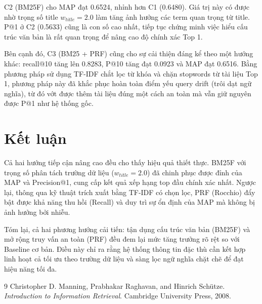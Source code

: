 \documentclass[12pt, a4paper]{article}
\begin{document}
C2 (BM25F) cho MAP đạt 0.6524, nhỉnh hơn C1 (0.6480). Giá trị này có được nhờ trọng số title $w_{title}=2.0$ làm tăng ảnh hưởng các term quan trọng từ title. P@1 ở C2 (0.5633) cũng là con số cao nhất, tiếp tục chứng minh việc hiểu cấu trúc văn bản là rất quan trọng để nâng cao độ chính xác Top 1.

Bên cạnh đó, C3 (BM25 + PRF) cũng cho sự cải thiện đáng kể theo một hướng khác: recall@10 tăng lên 0.8283, P@10 tăng đạt 0.0923 và MAP đạt 0.6516. Bằng phương pháp sử dụng TF-IDF chắt lọc từ khóa và chặn stopwords từ tài liệu Top 1, phương pháp này đã khắc phục hoàn toàn điểm yếu query drift (trôi dạt ngữ nghĩa), từ đó vớt được thêm tài liệu đúng một cách an toàn mà vẫn giữ nguyên được P@1 như hệ thống gốc.

\section{Kết luận}
Cả hai hướng tiếp cận nâng cao đều cho thấy hiệu quả thiết thực. BM25F với trọng số phân tách trường dữ liệu ($w_{title}=2.0$) đã chinh phục được đỉnh của MAP và Precision@1, cung cấp kết quả xếp hạng top đầu chính xác nhất. Ngược lại, thông qua kỹ thuật trích xuất bằng TF-IDF có chọn lọc, PRF (Rocchio) đẩy bật được khả năng thu hồi (Recall) và duy trì sự ổn định của MAP mà không bị ảnh hưởng bởi nhiễu.

Tóm lại, cả hai phương hướng cải tiến: tận dụng cấu trúc văn bản (BM25F) và mở rộng truy vấn an toàn (PRF) đều đem lại mức tăng trưởng rõ rệt so với Baseline cơ bản. Điều này chỉ ra rằng hệ thống thông tin đặc thù cần kết hợp linh hoạt cả tối ưu theo trường dữ liệu và sàng lọc ngữ nghĩa chặt chẽ để đạt hiệu năng tối đa.

\begin{thebibliography}{9}
Christopher D. Manning, Prabhakar Raghavan, and Hinrich Schütze. 
\textit{Introduction to Information Retrieval}. 
Cambridge University Press, 2008.
\end{thebibliography}
\end{document}
